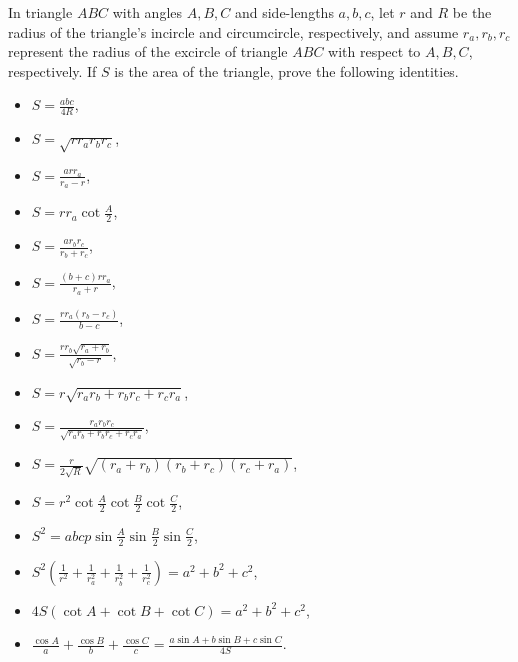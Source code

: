 \begin{tcolorbox}[title={Identities for Area in Terms of Triangle Radii}]
    \begin{question}[name=Area in Terms of Radii]
        In triangle $ABC$ with angles $A,B,C$ and side-lengths $a,b,c$, let $r$ and $R$ be the radius of the triangle's incircle and circumcircle, respectively, and assume $r_a,r_b,r_c$ represent the radius of the excircle of triangle $ABC$ with respect to $A,B,C$, respectively.
        If $S$ is the area of the triangle, prove the following identities.
        \begin{itemize}
            \item $S=\displaystyle \frac{abc}{4R}$,        
            \item $S=\sqrt{rr_ar_br_c}$,
            \item $S=\displaystyle \frac{arr_a}{r_a-r}$,
            \item $S=\displaystyle rr_a\cot\frac{A}{2}$,
            \item $S=\displaystyle \frac{ar_br_c}{r_b+r_c}$,
            \item $S=\displaystyle \frac{(b+c)rr_a}{r_a+r}$,
            \item $S=\displaystyle \frac{rr_a(r_b-r_c)}{b-c}$,
            \item $S=\displaystyle \frac{rr_b\sqrt{r_a+r_b}}{\sqrt{r_b-r}}$,
            \item $S=\displaystyle r\sqrt{r_ar_b+r_br_c+r_cr_a}$,
            \item $\displaystyle S=\frac{r_ar_br_c}{\sqrt{r_ar_b+r_br_c+r_cr_a}}$,
            \item $\displaystyle S=\frac{r}{2\sqrt R}\sqrt{(r_a+r_b)(r_b+r_c)(r_c+r_a)}$,
            \item $\displaystyle S = r^2 \cot \frac{A}{2}\cot \frac{B}{2}\cot \frac{C}{2}$,
            \item $\displaystyle S^2=abcp\sin\frac{A}{2}\sin\frac{B}{2}\sin\frac{C}{2}$,
            \item $\displaystyle S^2\left(\frac{1}{r^2}+\frac{1}{r_a^2}+\frac{1}{r_b^2}+\frac{1}{r_c^2}\right) = a^2+b^2+c^2$,
            \item $4S(\cot A + \cot B + \cot C)=a^2+b^2+c^2$,
            \item $\displaystyle \frac{\cos A}{a} + \frac{\cos B}{b} + \frac{\cos C}{c} = \frac{a\sin A + b\sin B + c\sin C}{4S}$.
        \end{itemize}
    \end{question}
\end{tcolorbox}


